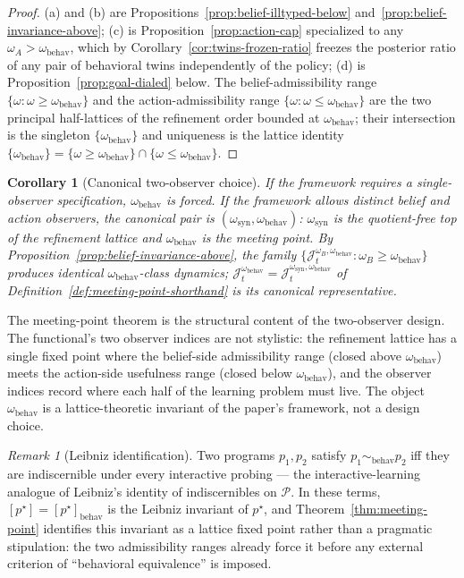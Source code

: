 \documentclass[11pt]{article}
\newtheorem{corollary}[theorem]{Corollary}
\theoremstyle{definition}
\theoremstyle{remark}
\newtheorem{remark}[theorem]{Remark}
\newcommand{\Pcal}{\mathcal{P}}
\begin{document}
\begin{proof}
(a) and (b) are Propositions~\ref{prop:belief-illtyped-below} and~\ref{prop:belief-invariance-above}; (c) is Proposition~\ref{prop:action-cap} specialized to any $\omega_A>\omega_{\mathrm{behav}}$, which by Corollary~\ref{cor:twins-frozen-ratio} freezes the posterior ratio of any pair of behavioral twins independently of the policy; (d) is Proposition~\ref{prop:goal-dialed} below. The belief-admissibility range $\{\omega:\omega\ge\omega_{\mathrm{behav}}\}$ and the action-admissibility range $\{\omega:\omega\le\omega_{\mathrm{behav}}\}$ are the two principal half-lattices of the refinement order bounded at $\omega_{\mathrm{behav}}$; their intersection is the singleton $\{\omega_{\mathrm{behav}}\}$ and uniqueness is the lattice identity $\{\omega_{\mathrm{behav}}\}=\{\omega\ge\omega_{\mathrm{behav}}\}\cap\{\omega\le\omega_{\mathrm{behav}}\}$.
\end{proof}

\begin{corollary}[Canonical two-observer choice]
\label{cor:canonical-pair}
If the framework requires a single-observer specification, $\omega_{\mathrm{behav}}$ is forced. If the framework allows distinct belief and action observers, the canonical pair is $(\omega_{\mathrm{syn}},\omega_{\mathrm{behav}})$: $\omega_{\mathrm{syn}}$ is the quotient-free top of the refinement lattice and $\omega_{\mathrm{behav}}$ is the meeting point. By Proposition~\ref{prop:belief-invariance-above}, the family $\{\mathcal J_t^{\omega_B,\omega_{\mathrm{behav}}}:\omega_B\ge\omega_{\mathrm{behav}}\}$ produces identical $\omega_{\mathrm{behav}}$-class dynamics; $\mathcal J_t^{\omega_{\mathrm{behav}}}=\mathcal J_t^{\omega_{\mathrm{syn}},\omega_{\mathrm{behav}}}$ of Definition~\ref{def:meeting-point-shorthand} is its canonical representative.
\end{corollary}

The meeting-point theorem is the structural content of the two-observer design. The functional's two observer indices are not stylistic: the refinement lattice has a single fixed point where the belief-side admissibility range (closed above $\omega_{\mathrm{behav}}$) meets the action-side usefulness range (closed below $\omega_{\mathrm{behav}}$), and the observer indices record where each half of the learning problem must live. The object $\omega_{\mathrm{behav}}$ is a lattice-theoretic invariant of the paper's framework, not a design choice.

\begin{remark}[Leibniz identification]
\label{rem:leibniz}
Two programs $p_1,p_2$ satisfy $p_1\sim_{\mathrm{behav}}p_2$ iff they are indiscernible under every interactive probing --- the interactive-learning analogue of Leibniz's identity of indiscernibles on $\Pcal$. In these terms, $[p^\star]=[p^\star]_{\mathrm{behav}}$ is the Leibniz invariant of $p^\star$, and Theorem~\ref{thm:meeting-point} identifies this invariant as a lattice fixed point rather than a pragmatic stipulation: the two admissibility ranges already force it before any external criterion of ``behavioral equivalence'' is imposed.
\end{remark}
\end{document}
